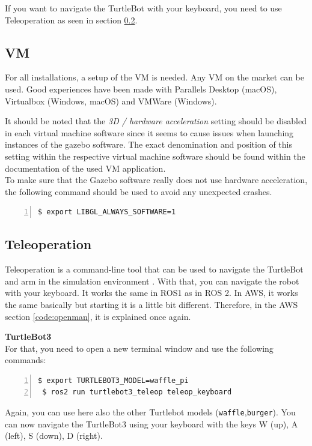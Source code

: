 \documentclass[plainarticle,zihtitle,english,final,hyperref,utf8]{zihpub}
\begin{document}
\newline 
If you want to navigate the TurtleBot with your keyboard, you need to use Teleoperation as seen in section \ref{sec:teleoperation}. 

\newpage
\subsection{VM}
For all installations, a setup of the VM is needed. Any VM on the market can be used. Good experiences have been made with Parallels Desktop (macOS), Virtualbox (Windows, macOS) and VMWare (Windows).
\newline

It should be noted that the \textit{3D / hardware acceleration} setting should be disabled in each virtual machine software since it seems to cause issues when launching instances of the gazebo software. The exact denomination and position of this setting within the respective virtual machine software should be found within the documentation of the used VM application.\\
\newline
To make sure that the Gazebo software really does not use hardware acceleration, the following command should be used to avoid any unexpected crashes.
\begin{Verbatim}[breaklines=true, breakanywhere=true, baselinestretch=1,fontsize=\scriptsize,numbers=left,frame=single,stepnumber=5,xleftmargin=1cm,xrightmargin=1cm]
$ export LIBGL_ALWAYS_SOFTWARE=1
    \end{Verbatim}
    

\subsection{Teleoperation}
\label{sec:teleoperation}
Teleoperation is a command-line tool that can be used to navigate the TurtleBot and arm in the simulation environment \cite{teleop2}. With that, you can navigate the robot with your keyboard. It works the same in ROS1 as in ROS 2. In AWS, it works the same basically but starting it is a little bit different. Therefore, in the AWS section \ref{code:openman}, it is explained once again.
\newline

\textbf{TurtleBot3}\\
\newline
For that, you need to open a new terminal window and use the following commands:
\begin{Verbatim}[breaklines=true, breakanywhere=true, baselinestretch=1,fontsize=\scriptsize,numbers=left,frame=single,stepnumber=5,xleftmargin=1cm,xrightmargin=1cm]
 $ export TURTLEBOT3_MODEL=waffle_pi
 $ ros2 run turtlebot3_teleop teleop_keyboard
    \end{Verbatim}
Again, you can use here also the other Turtlebot models (\texttt{waffle},\texttt{burger}). 
You can now navigate the TurtleBot3 using your keyboard with the keys W (up), A (left), S (down), D (right).
\end{document}
